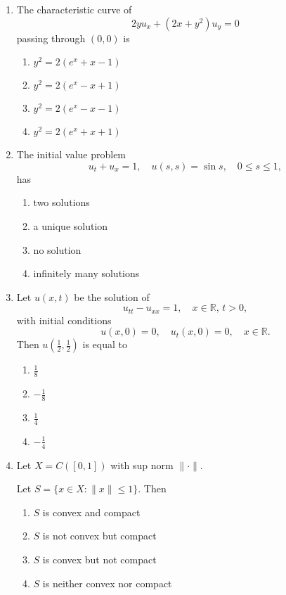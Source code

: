\documentclass[journal]{IEEEtran}
\numberwithin{equation}{enumi}
\numberwithin{figure}{enumi}
\begin{document}
\begin{enumerate}
\item
The characteristic curve of
\[
2 y u_x + (2x + y^2) u_y = 0
\]
passing through $(0,0)$ is
\hfill{}
\begin{multicols}{2}
\begin{enumerate}
    \item $y^2 = 2(e^x + x - 1)$
    \item $y^2 = 2(e^x - x + 1)$
    \item $y^2 = 2(e^x - x - 1)$
    \item $y^2 = 2(e^x + x + 1)$
\end{enumerate}
\end{multicols}

\item
The initial value problem
\[
u_t + u_x = 1, \quad u(s,s) = \sin s, \quad 0 \leq s \leq 1,
\]
has
\hfill{}
\begin{multicols}{2}
\begin{enumerate}
    \item two solutions
    \item a unique solution
    \item no solution
    \item infinitely many solutions
\end{enumerate}
\end{multicols}

\item
Let $u(x,t)$ be the solution of 
\[
u_{tt} - u_{xx} = 1, \quad x \in \mathbb{R}, \, t > 0,
\]
with initial conditions
\[
u(x,0) = 0, \quad u_t(x,0) = 0, \quad x \in \mathbb{R}.
\]
Then $u\left(\frac{1}{2}, \frac{1}{2}\right)$ is equal to
\hfill{}
\begin{multicols}{4}
\begin{enumerate}
    \item $\frac{1}{8}$
    \item $-\frac{1}{8}$
    \item $\frac{1}{4}$
    \item $-\frac{1}{4}$
\end{enumerate}
\end{multicols}

\item
Let $X = C([0,1])$ with sup norm $\|\cdot\|$.

Let $S = \{x \in X : \|x\| \leq 1\}$. Then
\hfill{}
\begin{multicols}{2}
\begin{enumerate}
    \item $S$ is convex and compact
    \item $S$ is not convex but compact
    \item $S$ is convex but not compact
    \item $S$ is neither convex nor compact
\end{enumerate}
\end{multicols}


\end{enumerate}
\end{document}
